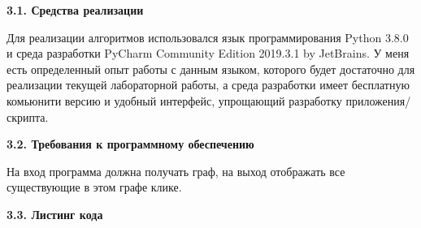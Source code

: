 \documentclass[a4paper,12pt]{report}
\begin{document}
	\begin{center}	
        \textbf{3.1. Средства реализации}
    \end{center}

        	Для реализации алгоритмов использовался язык программирования Python 3.8.0 и среда разработки PyCharm Community Edition 2019.3.1 by JetBrains. 
        	У меня есть определенный опыт работы с данным языком, которого будет достаточно для реализации текущей лабораторной работы, а среда разработки имеет бесплатную комьюнити версию и удобный интерфейс, упрощающий разработку приложения/скрипта.\\

	\begin{center}
		\textbf{3.2. Требования к программному обеспечению}
	\end{center}

			На вход программа должна получать граф, на выход отображать все существующие в этом графе клике.
	
	\begin{center}
		\textbf{3.3. Листинг кода}
	\end{center}
\end{document}
